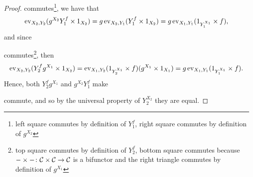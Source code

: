 \begin{solution}
\begin{proof}
        commutes\footnote{
            left square commutes by definition of $Y_1^f$, right square commutes by definition of $g^{X_2}$
        }, we have that
        \[ \operatorname{ev}_{X_2,Y_2}(g^{X_2}Y_1^f\times 1_{X_2})=g\operatorname{ev}_{X_2,Y_1}(Y_1^f\times 1_{X_2})=g\operatorname{ev}_{X_1,Y_1}(1_{Y_1^{X_1}}\times f),\]
        and since
        \begin{center}
        \end{center}
        commutes\footnote{
            top square commutes by definition of $Y_2^f$, bottom square commutes because $-\times -\colon\mathcal{C}\times\mathcal{C}\to\mathcal{C}$ is a bifunctor and  the right triangle commutes by definition of $g^{X_1}$
        }, then
        \[ \operatorname{ev}_{X_2,Y_2}(Y_2^f g^{X_1}\times 1_{X_2})=\operatorname{ev}_{X_1,Y_2}(1_{Y_2^{X_1}}\times f)(g^{X_1}\times 1_{X_1})=g\operatorname{ev}_{X_1,Y_1}(1_{Y_1^{X_1}}\times f).\]
        Hence, both $Y_2^fg^{X_1}$ and $g^{X_2}Y_1^f$ make
        \begin{center}
        \end{center}
        commute, and so by the universal property of $Y_2^{X_2}$ they are equal.
        
    \end{proof}
\end{solution}

